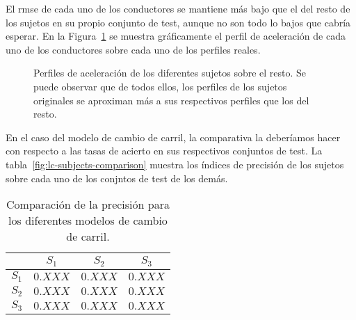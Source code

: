 El \ac{rmse} de cada uno de los conductores se mantiene más bajo que el del resto de los sujetos en su propio conjunto de test, aunque no son todo lo bajos que cabría esperar. En la Figura~\ref{fig:lm-subjects-comparison} se muestra gráficamente el perfil de aceleración de cada uno de los conductores sobre cada uno de los perfiles reales.

\begin{figure}[t]
	\centering
	\qquad
	\qquad
	\caption[Perfiles de aceleración de los diferentes sujetos sobre el resto]{Perfiles de aceleración de los diferentes sujetos sobre el resto. Se puede observar que de todos ellos, los perfiles de los sujetos originales se aproximan más a sus respectivos perfiles que los del resto.}
	\label{fig:lm-subjects-comparison}
\end{figure}

En el caso del modelo de cambio de carril, la comparativa la deberíamos hacer con respecto a las tasas de acierto en sus respectivos conjuntos de test. La tabla~\ref{fig:lc-subjects-comparison} muestra los índices de precisión de los sujetos sobre cada uno de los conjntos de test de los demás.

\begin{table}
	\centering
	\caption[Comparación de la precisión para los diferentes modelos de cambio de carril]{Comparación de la precisión para los diferentes modelos de cambio de carril.}
	\label{tbl:lc-subjects-comparison}
	\begin{tabular}{c|ccc}
		& \textbf{$S_1$} & \textbf{$S_2$} & \textbf{$S_3$} \\ \hline
		\textbf{$S_1$} & $0.XXX$ & $0.XXX$ & $0.XXX$ \\
		\textbf{$S_2$} & $0.XXX$ & $0.XXX$ & $0.XXX$ \\
		\textbf{$S_3$} & $0.XXX$ & $0.XXX$ & $0.XXX$ \\ \hline
	\end{tabular}
\end{table}